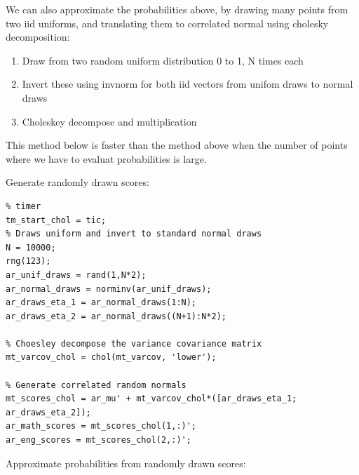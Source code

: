 \documentclass[
]{book}
\begin{document}
We can also approximate the probabilities above, by drawing many points
from two iid uniforms, and translating them to correlated normal using
cholesky decomposition:

\begin{enumerate}
\def\labelenumi{\arabic{enumi}.}
\item
  Draw from two random uniform distribution 0 to 1, N times each
\item
  Invert these using invnorm for both iid vectors from unifom draws to
  normal draws
\item
  Choleskey decompose and multiplication
\end{enumerate}

This method below is faster than the method above when the number of
points where we have to evaluat probabilities is large.

Generate randomly drawn scores:

\begin{verbatim}
% timer
tm_start_chol = tic;
% Draws uniform and invert to standard normal draws
N = 10000;
rng(123);
ar_unif_draws = rand(1,N*2);
ar_normal_draws = norminv(ar_unif_draws);
ar_draws_eta_1 = ar_normal_draws(1:N);
ar_draws_eta_2 = ar_normal_draws((N+1):N*2);

% Choesley decompose the variance covariance matrix
mt_varcov_chol = chol(mt_varcov, 'lower');

% Generate correlated random normals
mt_scores_chol = ar_mu' + mt_varcov_chol*([ar_draws_eta_1; ar_draws_eta_2]);
ar_math_scores = mt_scores_chol(1,:)';
ar_eng_scores = mt_scores_chol(2,:)';
\end{verbatim}

Approximate probabilities from randomly drawn scores:
\end{document}
